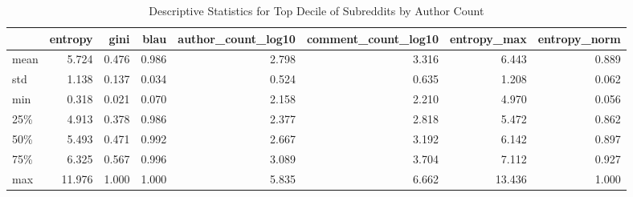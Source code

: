 \begin{table}
\centering
\begin{tabular}{lrrrrrrr}
\toprule
{} &  entropy &  gini &  blau &  author\_count\_log10 &  comment\_count\_log10 &  entropy\_max &  entropy\_norm \\
\midrule
mean &    5.724 & 0.476 & 0.986 &               2.798 &                3.316 &        6.443 &         0.889 \\
std  &    1.138 & 0.137 & 0.034 &               0.524 &                0.635 &        1.208 &         0.062 \\
min  &    0.318 & 0.021 & 0.070 &               2.158 &                2.210 &        4.970 &         0.056 \\
25\%  &    4.913 & 0.378 & 0.986 &               2.377 &                2.818 &        5.472 &         0.862 \\
50\%  &    5.493 & 0.471 & 0.992 &               2.667 &                3.192 &        6.142 &         0.897 \\
75\%  &    6.325 & 0.567 & 0.996 &               3.089 &                3.704 &        7.112 &         0.927 \\
max  &   11.976 & 1.000 & 1.000 &               5.835 &                6.662 &       13.436 &         1.000 \\
\bottomrule
\end{tabular}
\caption{Descriptive Statistics for Top Decile of Subreddits by Author Count}
\label{table/active}
\end{table}